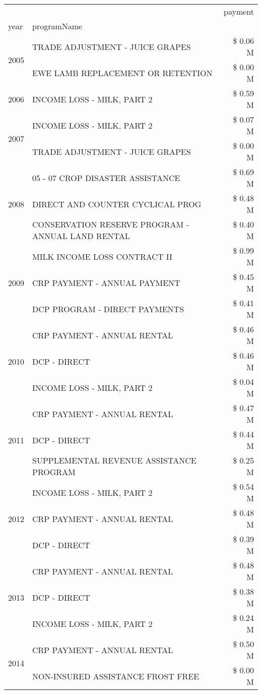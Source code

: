 \begin{tabular}{llr}
\toprule
 &  & payment \\
year & programName &  \\
\midrule
\multirow[t]{2}{*}{2005} & TRADE ADJUSTMENT - JUICE GRAPES & \$ 0.06 M \\
 & EWE LAMB REPLACEMENT OR RETENTION & \$ 0.00 M \\
\cline{1-3}
2006 & INCOME LOSS - MILK, PART 2 & \$ 0.59 M \\
\cline{1-3}
\multirow[t]{2}{*}{2007} & INCOME LOSS - MILK, PART 2 & \$ 0.07 M \\
 & TRADE ADJUSTMENT - JUICE GRAPES & \$ 0.00 M \\
\cline{1-3}
\multirow[t]{3}{*}{2008} & 05 - 07 CROP DISASTER ASSISTANCE & \$ 0.69 M \\
 & DIRECT AND COUNTER CYCLICAL PROG & \$ 0.48 M \\
 & CONSERVATION RESERVE PROGRAM - ANNUAL LAND RENTAL & \$ 0.40 M \\
\cline{1-3}
\multirow[t]{3}{*}{2009} & MILK INCOME LOSS CONTRACT II & \$ 0.99 M \\
 & CRP PAYMENT - ANNUAL PAYMENT & \$ 0.45 M \\
 & DCP PROGRAM - DIRECT PAYMENTS & \$ 0.41 M \\
\cline{1-3}
\multirow[t]{3}{*}{2010} & CRP PAYMENT - ANNUAL RENTAL & \$ 0.46 M \\
 & DCP - DIRECT & \$ 0.46 M \\
 & INCOME LOSS - MILK, PART 2 & \$ 0.04 M \\
\cline{1-3}
\multirow[t]{3}{*}{2011} & CRP PAYMENT - ANNUAL RENTAL & \$ 0.47 M \\
 & DCP - DIRECT & \$ 0.44 M \\
 & SUPPLEMENTAL REVENUE ASSISTANCE PROGRAM & \$ 0.25 M \\
\cline{1-3}
\multirow[t]{3}{*}{2012} & INCOME LOSS - MILK, PART 2 & \$ 0.54 M \\
 & CRP PAYMENT - ANNUAL RENTAL & \$ 0.48 M \\
 & DCP - DIRECT & \$ 0.39 M \\
\cline{1-3}
\multirow[t]{3}{*}{2013} & CRP PAYMENT - ANNUAL RENTAL & \$ 0.48 M \\
 & DCP - DIRECT & \$ 0.38 M \\
 & INCOME LOSS - MILK, PART 2 & \$ 0.24 M \\
\cline{1-3}
\multirow[t]{3}{*}{2014} & CRP PAYMENT - ANNUAL RENTAL & \$ 0.50 M \\
 & NON-INSURED ASSISTANCE FROST FREE & \$ 0.00 M \\

\end{tabular}
